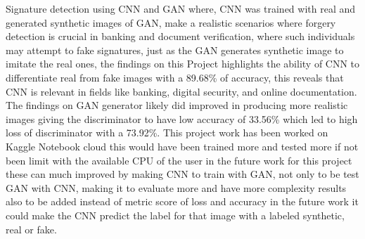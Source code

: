 \documentclass[12pt]{article}
\begin{document}
Signature detection using CNN and GAN where, CNN was trained with real and generated synthetic images of GAN, make a realistic scenarios where forgery detection is crucial in banking and document verification, where such individuals may attempt to fake signatures, just as the GAN generates synthetic image to imitate the real ones, the findings on this Project highlights the ability of CNN to differentiate real from fake images with a 89.68\% of accuracy, this reveals that CNN is relevant in fields like banking, digital security, and online documentation. The findings on GAN generator likely did improved in producing more realistic images giving the discriminator to have low accuracy of 33.56\% which led to high loss of discriminator with a 73.92\%. This project work has been worked on Kaggle Notebook cloud this would have been trained more and tested more if not been limit with the available CPU of the user in the future work for this project these can much improved by making CNN to train with GAN, not only to be test GAN with CNN, making it to evaluate more and have more complexity results also to be added instead of metric score of loss and accuracy in the future work it could make the CNN predict the label for that image with a labeled synthetic, real or fake.


 

\end{document}
